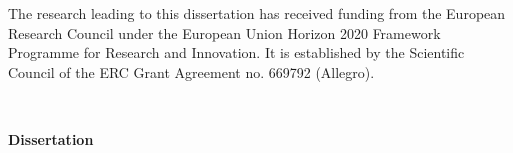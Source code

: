 \noindent The research leading to this dissertation has received funding from the European Research Council under the European Union Horizon 2020 Framework Programme for Research and Innovation. It is established by the Scientific Council of the ERC Grant Agreement no. 669792 (Allegro).




\newpage
\thispagestyle{empty}
\vspace*{30mm}

\begin{center}
     \textbf{\huge \thetitle}\\[\baselineskip]\textbf{\LARGE \thesubtitle}
\end{center}

\vspace{20mm}

\begin{center}
    \textbf{Dissertation}
\end{center}
\smallskip{}


